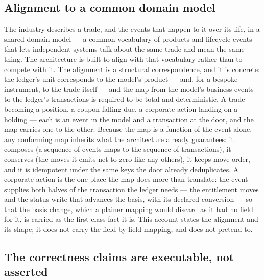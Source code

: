 \subsection{Alignment to a common domain model}

The industry describes a trade, and the events that happen to it over its life, in
a shared domain model --- a common vocabulary of products and lifecycle events that
lets independent systems talk about the same trade and mean the same thing. The
architecture is built to align with that vocabulary rather than to compete with it.
The alignment is a structural correspondence, and it is concrete: the ledger's unit
corresponds to the model's product --- and, for a bespoke instrument, to the trade
itself --- and the map from the model's business events to the ledger's transactions
is required to be total and deterministic. A trade becoming a position, a coupon
falling due, a corporate action landing on a holding --- each is an event in the
model and a transaction at the door, and the map carries one to the other. Because
the map is a function of the event alone, any conforming map inherits what the
architecture already guarantees: it composes (a sequence of events maps to the sequence of transactions),
it conserves (the moves it emits net to zero like any others), it keeps move order,
and it is idempotent under the same keys the door already deduplicates. A corporate
action is the one place the map does more than translate: the event supplies both
halves of the transaction the ledger needs --- the entitlement moves and the
status write that advances the basis, with its declared conversion --- so that the
basis change, which a plainer mapping would discard as it had no field for it, is
carried as the first-class fact it is. This account states the alignment and its
shape; it does not carry the field-by-field mapping, and does not pretend to.

\subsection{The correctness claims are executable, not asserted}

